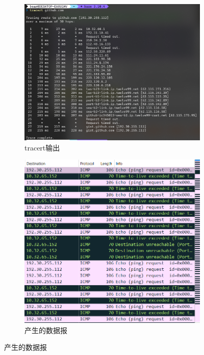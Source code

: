 \documentclass[a4paper,twoside]{article}
\begin{document}
\begin{spacing}{1.2}
\begin{figure}[htb]
	\centering
	\caption{tracert}
	\label{fig:tracert}
	\begin{subfigure}{0.4\textwidth}
		\centering
		\includegraphics[width=\textwidth]{tracert.png}
		\caption{tracert输出}
		\label{fig:tracert_out}
	\end{subfigure}
	\begin{subfigure}{0.4\textwidth}
		\centering
		\includegraphics[width=\textwidth]{tracert_package.png}
		\caption{产生的数据报}
		\label{fig:tracert_pack}
	\end{subfigure}
\end{figure}


\end{spacing}
\end{document}
